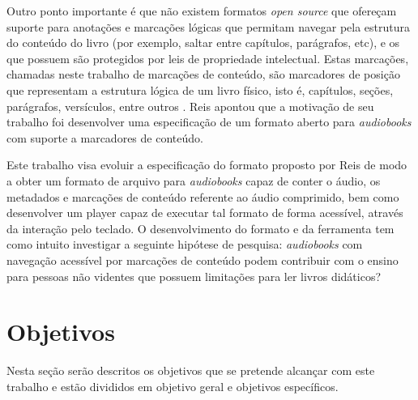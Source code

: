 Outro ponto importante é que não existem formatos \textit{open source} que ofereçam suporte para  anotações e marcações lógicas que permitam navegar pela estrutura do conteúdo do livro (por exemplo, saltar entre capítulos, parágrafos, etc), e os que possuem são protegidos por leis de propriedade intelectual. Estas marcações, chamadas neste trabalho de marcações de conteúdo, são marcadores de posição que representam a estrutura lógica de um livro físico, isto é, capítulos, seções, parágrafos, versículos, entre outros \cite{herbert}. Reis apontou que a motivação de seu trabalho foi desenvolver uma especificação de um formato aberto para \textit{audiobooks} com suporte a marcadores de conteúdo.

Este trabalho visa evoluir a especificação do formato proposto por Reis de modo a obter um formato de arquivo para \textit{audiobooks} capaz de conter o áudio, os metadados e marcações de conteúdo referente ao áudio comprimido, bem como desenvolver um player capaz de executar tal formato de forma acessível, através da interação pelo teclado. O desenvolvimento do formato e da ferramenta tem como intuito investigar a seguinte hipótese de pesquisa: \textit{audiobooks} com navegação acessível por marcações de conteúdo podem contribuir com o ensino para pessoas não videntes que possuem limitações para ler livros didáticos?


\section{Objetivos}

Nesta seção serão descritos os objetivos que se pretende alcançar com este trabalho e estão divididos em objetivo geral e objetivos específicos.

